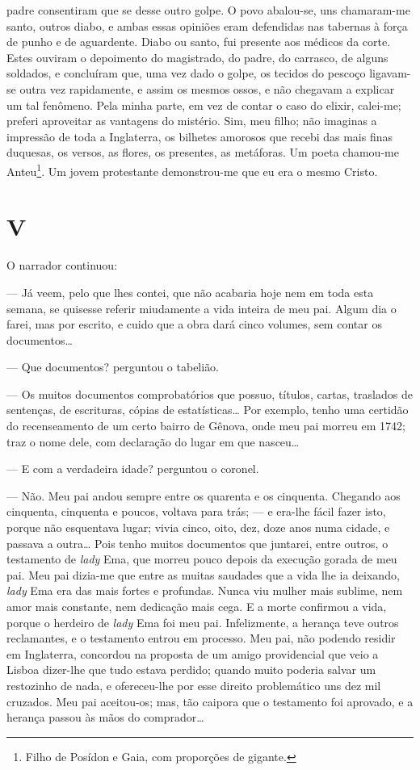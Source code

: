 padre consentiram que se desse outro golpe. O povo abalou-se, uns
chamaram-me santo, outros diabo, e ambas essas opiniões eram defendidas
nas tabernas à força de punho e de aguardente. Diabo ou santo, fui
presente aos médicos da corte. Estes ouviram o depoimento do magistrado,
do padre, do carrasco, de alguns soldados, e concluíram que, uma vez
dado o golpe, os tecidos do pescoço ligavam-se outra vez rapidamente, e
assim os mesmos ossos, e não chegavam a explicar um tal fenômeno. Pela
minha parte, em vez de contar o caso do elixir, calei-me; preferi
aproveitar as vantagens do mistério. Sim, meu filho; não imaginas a
impressão de toda a Inglaterra, os bilhetes amorosos que recebi das mais
finas duquesas, os versos, as flores, os presentes, as metáforas. Um
poeta chamou-me Anteu\footnote{Filho de Posídon e Gaia, com proporções
  de gigante.}. Um jovem protestante demonstrou-me que eu era o mesmo
Cristo.



\section*{V}



O narrador continuou:

--- Já veem, pelo que lhes contei, que não acabaria hoje nem em toda
esta semana, se quisesse referir miudamente a vida inteira de meu pai.
Algum dia o farei, mas por escrito, e cuido que a obra dará cinco
volumes, sem contar os documentos\ldots{}

--- Que documentos? perguntou o tabelião.

--- Os muitos documentos comprobatórios que possuo, títulos, cartas,
traslados de sentenças, de escrituras, cópias de estatísticas\ldots{} Por
exemplo, tenho uma certidão do recenseamento de um certo bairro de
Gênova, onde meu pai morreu em 1742; traz o nome dele, com declaração do
lugar em que nasceu\ldots{}

--- E com a verdadeira idade? perguntou o coronel.

--- Não. Meu pai andou sempre entre os quarenta e os cinquenta. Chegando
aos cinquenta, cinquenta e poucos, voltava para trás; --- e era-lhe
fácil fazer isto, porque não esquentava lugar; vivia cinco, oito, dez,
doze anos numa cidade, e passava a outra\ldots{} Pois tenho muitos documentos
que juntarei, entre outros, o testamento de \emph{lady} Ema, que morreu
pouco depois da execução gorada de meu pai. Meu pai dizia-me que entre
as muitas saudades que a vida lhe ia deixando, \emph{lady} Ema era das
mais fortes e profundas. Nunca viu mulher mais sublime, nem amor mais
constante, nem dedicação mais cega. E a morte confirmou a vida, porque o
herdeiro de \emph{lady} Ema foi meu pai. Infelizmente, a herança teve
outros reclamantes, e o testamento entrou em processo. Meu pai, não
podendo residir em Inglaterra, concordou na proposta de um amigo
providencial que veio a Lisboa dizer-lhe que tudo estava perdido; quando
muito poderia salvar um restozinho de nada, e ofereceu-lhe por esse
direito problemático uns dez mil cruzados. Meu pai aceitou-os; mas, tão
caipora que o testamento foi aprovado, e a herança passou às mãos do
comprador\ldots{}

